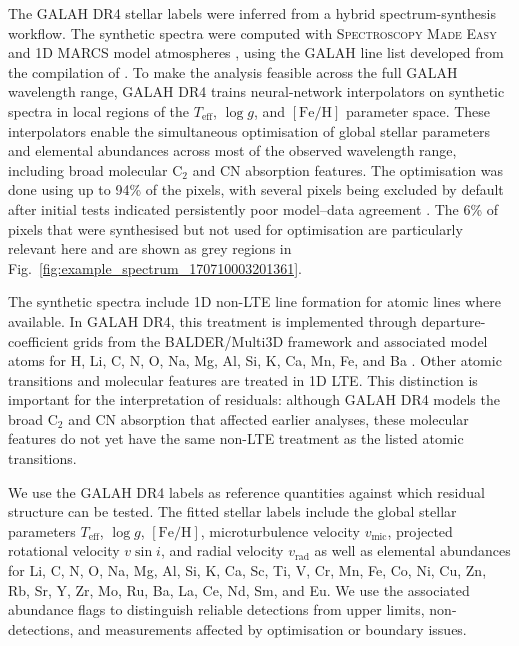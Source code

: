 \documentclass[twocolumn,apj,numberedappendix,appendixfloats]{openjournal}
\begin{document}
The GALAH DR4 stellar labels were inferred from a hybrid spectrum-synthesis workflow. The synthetic spectra were computed with \textsc{Spectroscopy Made Easy} \citep[SME;][]{Valenti1996, Piskunov2017} and 1D MARCS model atmospheres \citep{Gustafsson2008}, using the GALAH line list developed from the compilation of \citet{Heiter2021}. To make the analysis feasible across the full GALAH wavelength range, GALAH DR4 trains neural-network interpolators on synthetic spectra in local regions of the $T_\mathrm{eff}$, $\log g$, and $[\mathrm{Fe/H}]$ parameter space. These interpolators enable the simultaneous optimisation of global stellar parameters and elemental abundances across most of the observed wavelength range, including broad molecular C$_2$ and CN absorption features. The optimisation was done using up to 94\% of the pixels, with several pixels being excluded by default after initial tests indicated persistently poor model--data agreement \citep[for more details see Sec.~4.3.2 of][]{Buder2025b}. The 6\% of pixels that were synthesised but not used for optimisation are particularly relevant here and are shown as grey regions in Fig.~\ref{fig:example_spectrum_170710003201361}.

The synthetic spectra include 1D non-LTE line formation for atomic lines where available. In GALAH DR4, this treatment is implemented through departure-coefficient grids from the BALDER/Multi3D framework and associated model atoms for H, Li, C, N, O, Na, Mg, Al, Si, K, Ca, Mn, Fe, and Ba \citep[e.g.][]{Amarsi2020, Amarsi2022}. Other atomic transitions and molecular features are treated in 1D LTE. This distinction is important for the interpretation of residuals: although GALAH DR4 models the broad C$_2$ and CN absorption that affected earlier analyses, these molecular features do not yet have the same non-LTE treatment as the listed atomic transitions.

We use the GALAH DR4 labels as reference quantities against which residual structure can be tested. The fitted stellar labels include the global stellar parameters $T_\mathrm{eff}$, $\log g$, $[\mathrm{Fe/H}]$, microturbulence velocity $v_\mathrm{mic}$, projected rotational velocity $v\sin i$, and radial velocity $v_\mathrm{rad}$ as well as elemental abundances for Li, C, N, O, Na, Mg, Al, Si, K, Ca, Sc, Ti, V, Cr, Mn, Fe, Co, Ni, Cu, Zn, Rb, Sr, Y, Zr, Mo, Ru, Ba, La, Ce, Nd, Sm, and Eu. We use the associated abundance flags to distinguish reliable detections from upper limits, non-detections, and measurements affected by optimisation or boundary issues.
\end{document}
